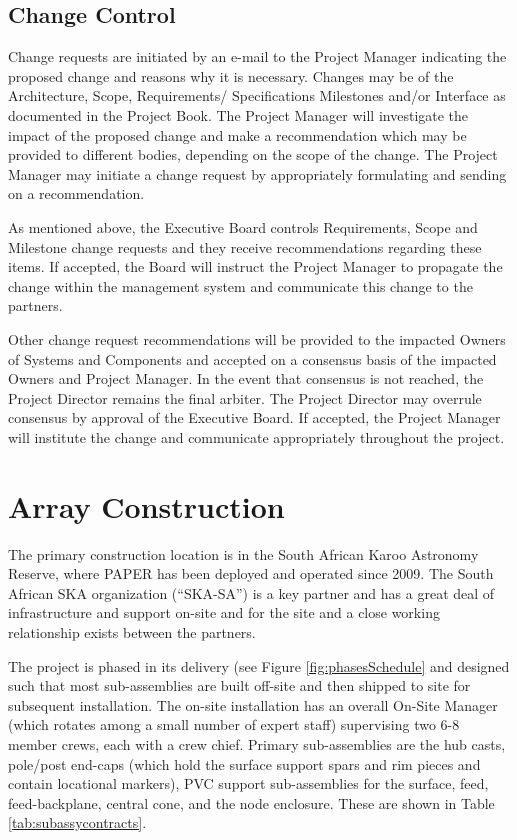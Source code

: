 \documentclass[preprint]{aastex}
\begin{document}
\subsection{Change Control}
\label{sec:changecontrol}
Change requests are initiated by an e-mail to the Project Manager indicating the proposed change
and reasons why it is necessary.  Changes may be of the Architecture, Scope, Requirements/ Specifications
Milestones and/or Interface as documented in the Project Book.  The Project Manager will investigate the 
impact of the proposed change and make a recommendation which may be provided to different bodies, 
depending on the scope of the change.  The Project Manager may initiate a change request by appropriately 
formulating and sending on a recommendation.

As mentioned above, the Executive Board controls Requirements, Scope and Milestone change requests
and they receive recommendations regarding these items.  If accepted, the Board will instruct the Project Manager to 
propagate the change within the management system and communicate this change to the partners.

Other change request recommendations will be provided to the impacted Owners of Systems and
Components and accepted on a consensus basis of the impacted Owners and Project Manager.  
In the event that consensus is not reached, the Project Director remains the final arbiter.  The Project 
Director may overrule consensus by approval of the Executive Board.  If accepted, the Project Manager 
will institute the change and communicate appropriately throughout the project.

\section{Array Construction}
\label{sec:construction}
The primary construction location is in the South African Karoo Astronomy Reserve, where PAPER has been deployed
and operated since 2009.  The South African SKA organization (``SKA-SA'') is a key partner and has a great deal of
infrastructure and support on-site and for the site and a close working relationship exists between the partners.

The project is phased in its delivery (see Figure \ref{fig:phasesSchedule} and
designed such that most sub-assemblies are built off-site and then shipped to site
for subsequent installation. The on-site installation has an overall On-Site Manager
(which rotates among a small number of expert staff) supervising two 6-8 member
crews, each with a crew chief. Primary sub-assemblies are the hub casts, pole/post
end-caps (which hold the surface support spars and rim pieces and contain locational
markers), PVC support sub-assemblies for the surface, feed, feed-backplane, central
cone, and the node enclosure. These are shown in Table \ref{tab:subassycontracts}.
\end{document}
